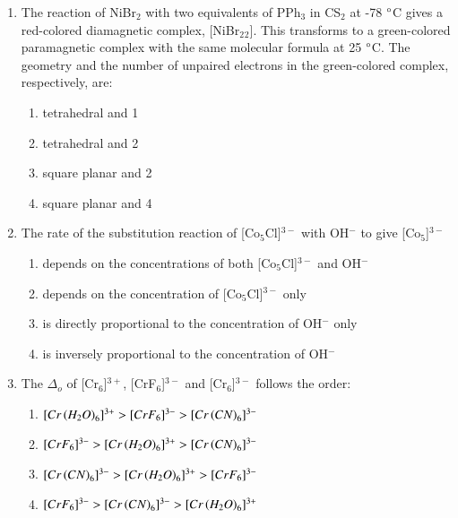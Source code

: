 \documentclass[journal,12pt,onecolumn]{IEEEtran}
\begin{document}
\begin{enumerate}
    \item The reaction of NiBr$_{2}$ with two equivalents of PPh$_{3}$ in CS$_{2}$ at -78 $\degree$C gives a red-colored diamagnetic complex, [NiBr$_{2}$$_{2}$]. This transforms to a green-colored paramagnetic complex with the same molecular formula at 25 $\degree$C. The geometry and the number of unpaired electrons in the green-colored complex, respectively, are:
    \begin{multicols}{2}
    \begin{enumerate}
        \item tetrahedral and 1
        \item tetrahedral and 2
        \item square planar and 2
        \item square planar and 4
    \end{enumerate}
    \end{multicols}
    \hfill{}

    \item The rate of the substitution reaction of [Co$_{5}$Cl]$^{3-}$ with OH$^{-}$ to give [Co$_{5}$]$^{3-}$
    \begin{multicols}{2}
    \begin{enumerate}
        \item depends on the concentrations of both [Co$_{5}$Cl]$^{3-}$ and OH$^{-}$
        \item depends on the concentration of [Co$_{5}$Cl]$^{3-}$ only
        \item is directly proportional to the concentration of OH$^{-}$ only
        \item is inversely proportional to the concentration of OH$^{-}$
    \end{enumerate}
    \end{multicols}
    \hfill{}

    \item The $\Delta_o$ of [Cr$_6$]$^{3+}$, [CrF$_6$]$^{3-}$ and [Cr$_6$]$^{3-}$ follows the order:
    
    \begin{enumerate}
        \item$[Cr\left(H_2O\right)_6]^{3+} > [CrF_6]^{3-} > [Cr\left(CN\right)_6]^{3-}$
        \item $[CrF_6]^{3-} > [Cr\left(H_2O\right)_6]^{3+} > [Cr\left(CN\right)_6]^{3-}$
        \item $[Cr\left(CN\right)_6]^{3-} > [Cr\left(H_2O\right)_6]^{3+} > [CrF_6]^{3-}$
        \item$[CrF_6]^{3-} > [Cr\left(CN\right)_6]^{3-} > [Cr\left(H_2O\right)_6]^{3+}$
    \end{enumerate}
   

\end{enumerate}
\end{document}
